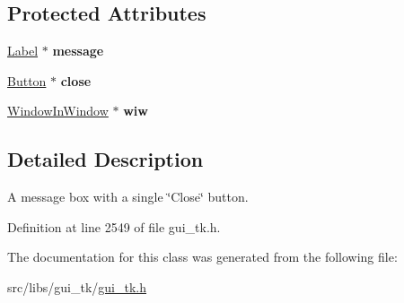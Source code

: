 \subsection*{Protected Attributes}
\begin{DoxyCompactItemize}
\item 
\hypertarget{classGUI_1_1MessageBox2_ad92a769376304d84d69e90614b2b64d8}{\hyperlink{classGUI_1_1Label}{Label} $\ast$ {\bfseries message}}\label{classGUI_1_1MessageBox2_ad92a769376304d84d69e90614b2b64d8}

\item 
\hypertarget{classGUI_1_1MessageBox2_ab17891fbe30f8b0f2f51038c9b1e2dbe}{\hyperlink{classGUI_1_1Button}{Button} $\ast$ {\bfseries close}}\label{classGUI_1_1MessageBox2_ab17891fbe30f8b0f2f51038c9b1e2dbe}

\item 
\hypertarget{classGUI_1_1MessageBox2_a065b16755f7b624cdf5e23b2ad4daeac}{\hyperlink{classGUI_1_1WindowInWindow}{Window\-In\-Window} $\ast$ {\bfseries wiw}}\label{classGUI_1_1MessageBox2_a065b16755f7b624cdf5e23b2ad4daeac}

\end{DoxyCompactItemize}


\subsection{Detailed Description}
A message box with a single \char`\"{}\-Close\char`\"{} button. 

Definition at line 2549 of file gui\-\_\-tk.\-h.



The documentation for this class was generated from the following file\-:\begin{DoxyCompactItemize}
\item 
src/libs/gui\-\_\-tk/\hyperlink{gui__tk_8h}{gui\-\_\-tk.\-h}\end{DoxyCompactItemize}
